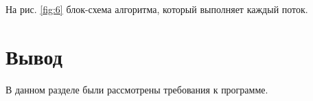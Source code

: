 На рис. \ref{fig:6} блок-схема алгоритма, который выполняет каждый поток. 

\begin{figure}[ht!]
\end{figure}

\newpage

\section{Вывод}

В данном разделе были рассмотрены требования к программе.






